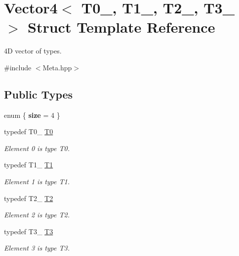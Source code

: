\hypertarget{struct_d_o_1_1_meta_1_1_vector4}{\section{Vector4$<$ T0\-\_\-, T1\-\_\-, T2\-\_\-, T3\-\_\- $>$ Struct Template Reference}
\label{struct_d_o_1_1_meta_1_1_vector4}
}


4\-D vector of types.  




{\ttfamily \#include $<$Meta.\-hpp$>$}

\subsection*{Public Types}
\begin{DoxyCompactItemize}
\item 
enum \{ {\bfseries size} = 4
 \}
\item 
\hypertarget{struct_d_o_1_1_meta_1_1_vector4_a6f4dd1548d86d57a7e5bdf98e74025cd}{typedef T0\-\_\- \hyperlink{struct_d_o_1_1_meta_1_1_vector4_a6f4dd1548d86d57a7e5bdf98e74025cd}{T0}}\label{struct_d_o_1_1_meta_1_1_vector4_a6f4dd1548d86d57a7e5bdf98e74025cd}

\begin{DoxyCompactList}\small\item\em Element 0 is type T0. \end{DoxyCompactList}\item 
\hypertarget{struct_d_o_1_1_meta_1_1_vector4_ae11d8678c6e0ac8e98f27b6dfdb5d73e}{typedef T1\-\_\- \hyperlink{struct_d_o_1_1_meta_1_1_vector4_ae11d8678c6e0ac8e98f27b6dfdb5d73e}{T1}}\label{struct_d_o_1_1_meta_1_1_vector4_ae11d8678c6e0ac8e98f27b6dfdb5d73e}

\begin{DoxyCompactList}\small\item\em Element 1 is type T1. \end{DoxyCompactList}\item 
\hypertarget{struct_d_o_1_1_meta_1_1_vector4_acbff7929c9f657ca83ddd209a08f7d62}{typedef T2\-\_\- \hyperlink{struct_d_o_1_1_meta_1_1_vector4_acbff7929c9f657ca83ddd209a08f7d62}{T2}}\label{struct_d_o_1_1_meta_1_1_vector4_acbff7929c9f657ca83ddd209a08f7d62}

\begin{DoxyCompactList}\small\item\em Element 2 is type T2. \end{DoxyCompactList}\item 
\hypertarget{struct_d_o_1_1_meta_1_1_vector4_af4c555323f12d8f0d74cbece2c5c4a47}{typedef T3\-\_\- \hyperlink{struct_d_o_1_1_meta_1_1_vector4_af4c555323f12d8f0d74cbece2c5c4a47}{T3}}\label{struct_d_o_1_1_meta_1_1_vector4_af4c555323f12d8f0d74cbece2c5c4a47}

\begin{DoxyCompactList}\small\item\em Element 3 is type T3. \end{DoxyCompactList}\end{DoxyCompactItemize}


